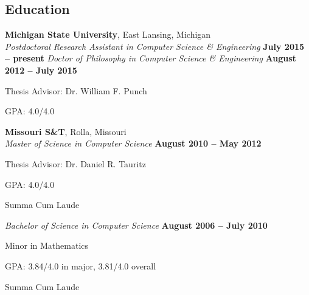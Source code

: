 \documentclass[margin,line]{resume}
\begin{document}
\begin{resume}
    \section{\mysidestyle Education}
    \textbf{Michigan State University}, East Lansing, Michigan \vspace{2mm}\\\vspace{1mm}%
    \textsl{Postdoctoral Research Assistant in Computer Science \& Engineering} \hfill \textbf{ July 2015 -- present}
    \textsl{Doctor of Philosophy in Computer Science \& Engineering} \hfill \textbf{ August 2012 -- July 2015}\vspace{-3mm}\\\vspace{-1mm}%
    \begin{list2}
        \item Thesis Advisor:  Dr. William F. Punch
        \item GPA: 4.0/4.0
    \end{list2}\vspace{-1.5mm}
    \textbf{Missouri S\&T}, Rolla, Missouri \vspace{2mm}\\\vspace{1mm}%
    \textsl{Master of Science in Computer Science} \hfill \textbf{ August 2010 -- May 2012}\vspace{-3mm}\\\vspace{-1mm}%
    \begin{list2}
        \item Thesis Advisor:  Dr. Daniel R. Tauritz
        \item GPA: 4.0/4.0
        \item Summa Cum Laude
    \end{list2}\vspace{-1.5mm}
    \textsl{Bachelor of Science in Computer Science} \hfill \textbf{ August 2006 -- July 2010}\vspace{-3mm}\\\vspace{-1mm}%
    \begin{list2}
        \item Minor in Mathematics
        \item GPA: 3.84/4.0 in major, 3.81/4.0 overall
        \item Summa Cum Laude
    \end{list2}\vspace{-1.5mm}


\end{resume}
\end{document}
